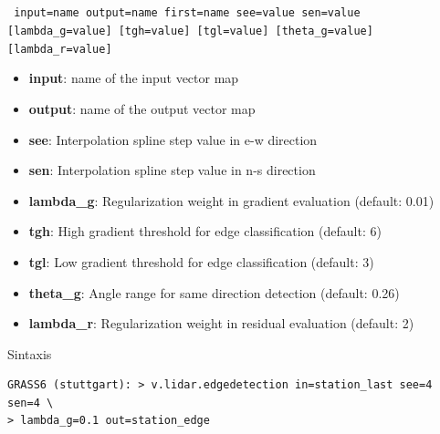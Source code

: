 \subsection{}
\begin{frame}[fragile,shrink=10]
  \frametitle{}
  \begin{beamerboxesrounded}[shadow=true]{\textbf{}
    \texttt{ input=name output=name first=name see=value sen=value 
    [lambda\_g=value] [tgh=value] [tgl=value] [theta\_g=value] [lambda\_r=value]}}
   \begin{itemize}
    \item \textbf{input}: name of the input vector map
    \item \textbf{output}: name of the output vector map
    \item \textbf{see}: Interpolation spline step value in e-w direction
    \item \textbf{sen}: Interpolation spline step value in n-s direction
    \item \textbf{lambda\_g}: Regularization weight in gradient evaluation (default: 0.01)
    \item \textbf{tgh}: High gradient threshold for edge classification (default: 6)
    \item \textbf{tgl}: Low gradient threshold for edge classification (default: 3)
    \item \textbf{theta\_g}: Angle range for same direction detection (default: 0.26)
    \item \textbf{lambda\_r}: Regularization weight in residual evaluation (default: 2)
   \end{itemize}
  \end{beamerboxesrounded}
 \begin{beamerboxesrounded}[shadow=true]{Sintaxis}
\scriptsize
\begin{verbatim}
GRASS6 (stuttgart): > v.lidar.edgedetection in=station_last see=4 sen=4 \
> lambda_g=0.1 out=station_edge
\end{verbatim}
\end{beamerboxesrounded}
\end{frame}
\pgfdeclareimage[width=0.65\textwidth]{edge}{images/edge}
